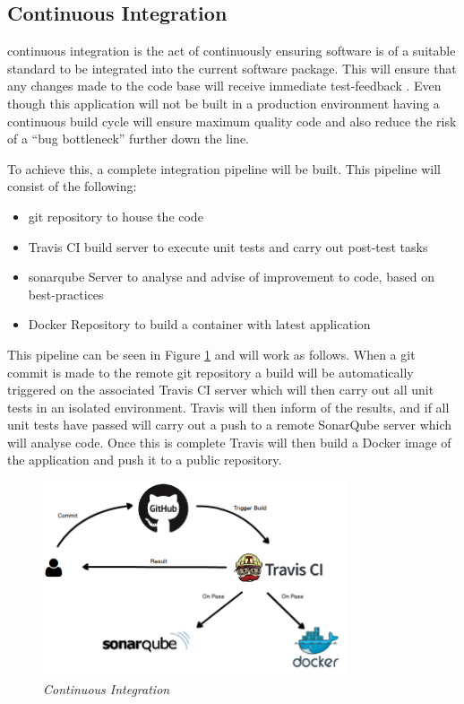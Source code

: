 \subsection{Continuous Integration}
\label{subs:CI}
\gls{continuous integration} is the act of continuously ensuring software is of a suitable standard to be integrated into the current software package. This will ensure that any changes made to the code base will receive immediate test-feedback \citep{Fowler2006}. Even though this application will not be built in a production environment having a continuous build cycle will ensure maximum quality code and also reduce the risk of a ``bug bottleneck'' further down the line.

To achieve this, a complete integration pipeline will be built. This pipeline will consist of the following:

\begin{itemize}
	\item \gls{git} repository to house the code
	\item Travis CI build server to execute unit tests and carry out post-test tasks
	\item \gls{sonarqube} Server to analyse and advise of improvement to code, based on best-practices
	\item Docker Repository to build a container with latest application
\end{itemize}

This pipeline can be seen in Figure \ref{fig:CI} and will work as follows. When a git commit is made to the remote git repository a build will be automatically triggered on the associated Travis CI server which will then carry out all unit tests in an isolated environment. Travis will then inform of the results, and if all unit tests have passed will carry out a push to a remote SonarQube server which will analyse code. Once this is complete Travis will then build a Docker image of the application and push it to a public repository.

\begin{figure}[!ht]
\centering
\includegraphics*[width=0.8\textwidth]{images/CI}
\caption{\em Continuous Integration}
\label{fig:CI}
\end{figure}

